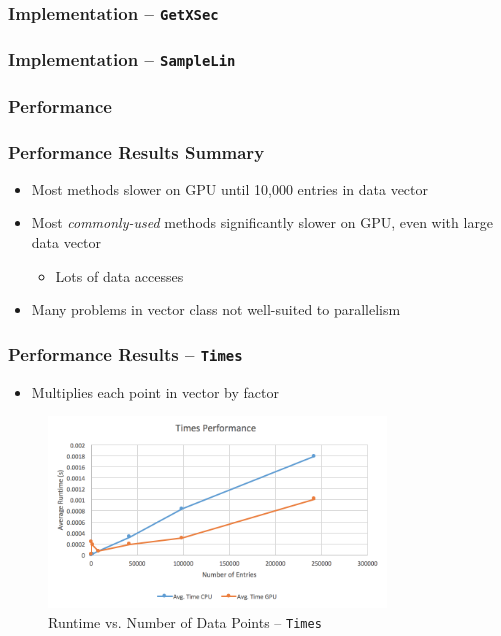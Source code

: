 \documentclass{beamer}
\newcommand{\textapprox}{\raisebox{0.5ex}{\texttildelow}}
\begin{document}
\begin{frame}
\frametitle{Implementation -- \texttt{GetXSec}}
\end{frame}

\begin{frame}
\frametitle{Implementation -- \texttt{SampleLin}}
\end{frame}

\subsubsection{Performance}
\begin{frame}
\frametitle{Performance Results Summary}
\begin{itemize}
\item Most methods slower on GPU until \textapprox 10,000 entries in data vector
\item Most \emph{commonly-used} methods significantly slower on GPU, even with large data vector
\begin{itemize}
\item Lots of data accesses
\end{itemize}
\item Many problems in vector class not well-suited to parallelism
\end{itemize}
\end{frame}

\begin{frame}
\frametitle{Performance Results -- \texttt{Times}}
\begin{itemize}
\item Multiplies each point in vector by factor
\end{itemize}
\begin{figure}
\centering
\includegraphics[width=0.8\textwidth]{images/times_line.png}
\caption{Runtime vs. Number of Data Points -- \texttt{Times}}
\end{figure}
\end{frame}
\end{document}
